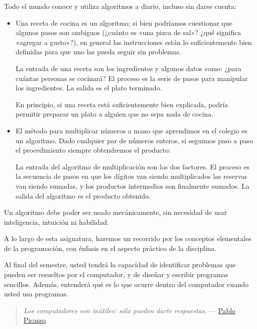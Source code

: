 Todo el mundo conoce y utiliza algoritmos a diario, incluso sin darse
cuenta:

\begin{itemize}
\item
  Una receta de cocina es un algoritmo; si bien podríamos cuestionar que
  algunos pasos son ambiguos (¿cuánto es «una pizca de sal»? ¿qué
  significa «agregar a gusto»?), en general las instrucciones están lo
  suficientemente bien definidas para que uno las pueda seguir sin
  problemas.

  La entrada de una receta son los ingredientes y algunos datos como:
  ¿para cuántas personas se cocinará? El proceso es la serie de pasos
  para manipular los ingredientes. La salida es el plato terminado.

  En principio, si una receta está suficientemente bien explicada,
  podría permitir preparar un plato a alguien que no sepa nada de
  cocina.
\end{itemize}

\begin{itemize}
\item
  El 
      método para multiplicar
  números a mano que aprendimos en el colegio es un
  algoritmo. Dado cualquier par de números enteros, si seguimos paso a
  paso el procedimiento siempre obtendremos el producto:


  La entrada del algoritmo de multiplicación son los dos factores. El
  proceso es la secuencia de pasos en que los dígitos van siendo
  multiplicados las reservas van siendo sumadas, y los productos
  intermedios son finalmente sumados. La salida del algoritmo es el
  producto obtenido.
\end{itemize}

Un algoritmo debe poder ser usado mecánicamente, sin necesidad de usar
inteligencia, intuición ni habilidad.

A lo largo de esta asignatura, haremos un recorrido por los conceptos
elementales de la programación, con énfasis en el aspecto práctico de la
disciplina.

Al final del semestre, usted tendrá la capacidad de identificar
problemas que pueden ser resueltos por el computador, y de diseñar y
escribir programas sencillos. Además, entenderá qué es lo que ocurre
dentro del computador cuando usted usa programas.

\begin{quote}
\emph{Los computadores son inútiles: sólo pueden darte respuestas}. ---
\href{http://es.wikipedia.org/wiki/Pablo_Picasso}{Pablo Picasso}.
\end{quote}
